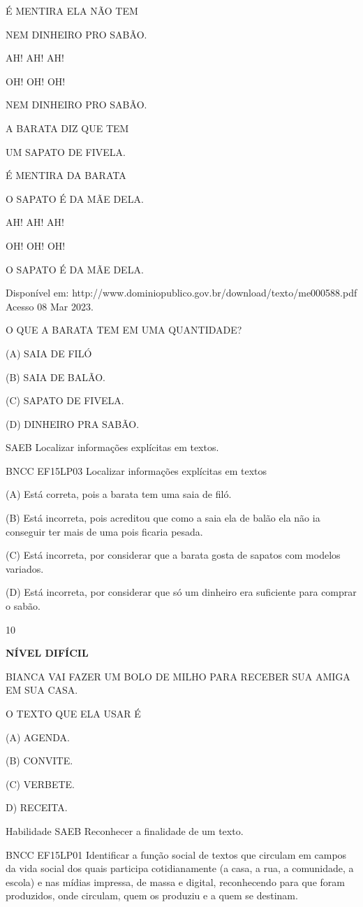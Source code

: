 {{É MENTIRA ELA NÃO TEM

NEM DINHEIRO PRO SABÃO.

AH! AH! AH!

OH! OH! OH!

NEM DINHEIRO PRO SABÃO.

A BARATA DIZ QUE TEM

UM SAPATO DE FIVELA.

É MENTIRA DA BARATA

O SAPATO É DA MÃE DELA.

AH! AH! AH!

OH! OH! OH!

O SAPATO É DA MÃE DELA.

Disponível em:
http://www.dominiopublico.gov.br/download/texto/me000588.pdf Acesso 08
Mar 2023.

O QUE A BARATA TEM EM UMA QUANTIDADE?

(A) SAIA DE FILÓ

(B) SAIA DE BALÃO.

(C) SAPATO DE FIVELA.

(D) DINHEIRO PRA SABÃO.

SAEB Localizar informações explícitas em textos.

BNCC EF15LP03 Localizar informações explícitas em textos

(A) Está correta, pois a barata tem uma saia de filó.

(B) Está incorreta, pois acreditou que como a saia ela de balão ela não
ia conseguir ter mais de uma pois ficaria pesada.

(C) Está incorreta, por considerar que a barata gosta de sapatos com
modelos variados.

(D) Está incorreta, por considerar que só um dinheiro era suficiente
para comprar o sabão.

\num{10}

\textbf{NÍVEL DIFÍCIL}

BIANCA VAI FAZER UM BOLO DE MILHO PARA RECEBER SUA AMIGA EM SUA CASA.

O TEXTO QUE ELA USAR É

(A) AGENDA.

(B) CONVITE.

(C) VERBETE.

D) RECEITA.

Habilidade SAEB Reconhecer a finalidade de um texto.

BNCC EF15LP01 Identificar a função social de textos que circulam em
campos da vida social dos quais participa cotidianamente (a casa, a rua,
a comunidade, a escola) e nas mídias impressa, de massa e digital,
reconhecendo para que foram produzidos, onde circulam, quem os produziu
e a quem se destinam.

}}
